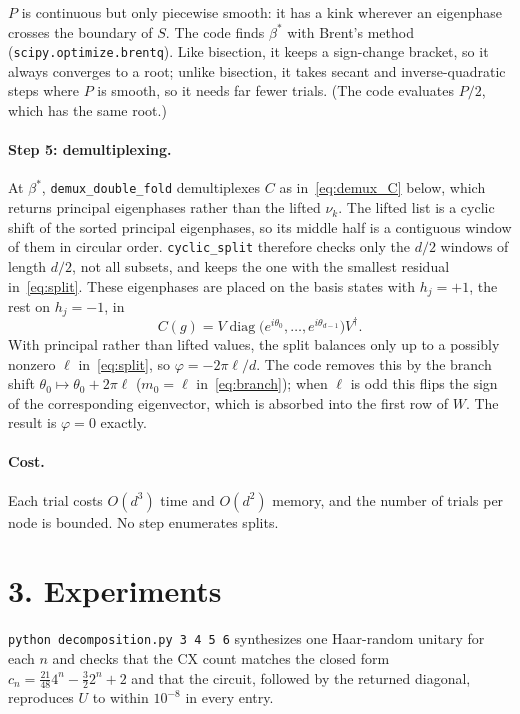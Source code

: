\documentclass[11pt]{article}
\begin{document}
$P$ is continuous but only piecewise smooth: it has a kink wherever an eigenphase crosses the
boundary of $S$. The code finds $\beta^\ast$ with Brent's method (\texttt{scipy.optimize.brentq}).
Like bisection, it keeps a sign-change bracket, so it always converges to a root; unlike
bisection, it takes secant and inverse-quadratic steps where $P$ is smooth, so it needs far fewer
trials. (The code evaluates $P/2$, which has the same root.)

\paragraph{Step 5: demultiplexing.} At $\beta^\ast$, \texttt{demux\_double\_fold} demultiplexes
$C$ as in~\eqref{eq:demux_C} below, which returns principal eigenphases rather than the lifted
$\nu_k$. The lifted list is a cyclic shift of the sorted principal eigenphases, so its middle half
is a contiguous window of them in circular order. \texttt{cyclic\_split} therefore checks only the
$d/2$ windows of length $d/2$, not all subsets, and keeps the one with the smallest residual
in~\eqref{eq:split}. These eigenphases are placed on the basis states with $h_j=+1$, the rest on
$h_j=-1$, in
\begin{equation}\label{eq:demux_C}
C(g)=V\operatorname{diag}\big(e^{i\theta_0},\dots,e^{i\theta_{d-1}}\big)V^\dagger .
\end{equation}
With principal rather than lifted values, the split balances only up to a possibly nonzero
$\ell$ in~\eqref{eq:split}, so $\varphi=-2\pi\ell/d$. The code removes this by the branch shift
$\theta_0\mapsto\theta_0+2\pi\ell$ ($m_0=\ell$ in~\eqref{eq:branch}); when $\ell$ is odd this
flips the sign of the corresponding eigenvector, which is absorbed into the first row of $W$.
The result is $\varphi=0$ exactly.

\paragraph{Cost.} Each trial costs $O(d^3)$ time and $O(d^2)$ memory, and the number of trials per
node is bounded. No step enumerates splits.

\section*{3. Experiments}

\texttt{python decomposition.py 3 4 5 6} synthesizes one Haar-random unitary for each $n$ and
checks that the CX count matches the closed form
$c_n=\tfrac{21}{48}4^n-\tfrac32 2^n+2$ and that the circuit, followed by the returned diagonal,
reproduces $U$ to within $10^{-8}$ in every entry.
\end{document}
